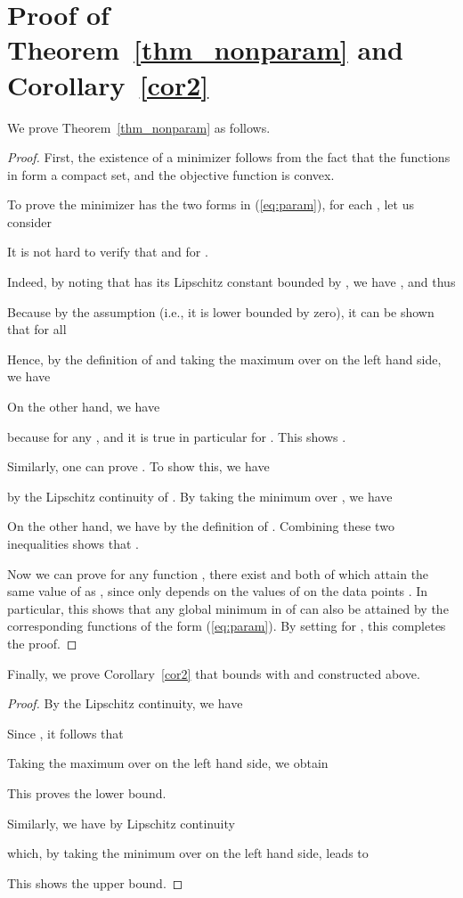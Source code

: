 \documentclass[11pt,fullpage, letterpaper,twoside]{article}
\newcommand{\1}[1]{\mathds{1}_{\left[#1\right]}}
\begin{document}
\section{Proof of Theorem~\ref{thm_nonparam} and Corollary~\ref{cor2}}\label{proof_b}
We prove Theorem~\ref{thm_nonparam} as follows.

\begin{proof}
First, the existence of a minimizer follows from the fact that the functions in  form a compact set, and the objective function is convex.

To prove the minimizer has the two forms in (\ref{eq:param}), for each , let us consider


It is not hard to verify that  and  for .

Indeed, by noting that  has its Lipschitz constant bounded by , we have , and thus

Because  by the assumption (i.e., it is lower bounded by zero), it can be shown that for all 

Hence, by the definition of  and taking the maximum over  on the left hand side, we have


On the other hand,  we have

because  for any , and it is true in particular for .  This shows .

Similarly, one can prove . To show this, we have

by the Lipschitz continuity of . By taking the minimum over , we have

On the other hand, we have  by the definition of .  Combining these two inequalities shows that .

Now we can prove for any function , there exist  and  both of which attain the same value of  as , since  only depends on the values of  on the data points . In particular, this shows that any global minimum in  of  can also be attained by the corresponding functions of the form (\ref{eq:param}). By setting  for , this completes the proof.
\end{proof}

Finally, we prove Corollary~\ref{cor2} that bounds  with  and  constructed above.
\begin{proof}
By the Lipschitz continuity, we have

Since , it follows that

Taking the maximum over  on the left hand side, we obtain

This proves the lower bound.

Similarly, we have by Lipschitz continuity

which, by taking the minimum over  on the left hand side, leads to

This shows the upper bound.
\end{proof}
\end{document}
